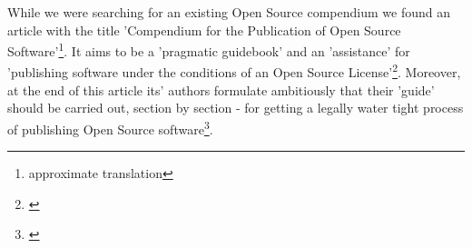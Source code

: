 %
%
%
%

%
While we were searching for an existing Open Source compendium we found an
article with the title 'Compendium for the Publication of Open Source
Software'\footnote{approximate translation}. It aims to be a 'pragmatic
guidebook' and an 'assistance' for 'publishing software under the conditions of
an Open Source License'\footnote{\cite[cf.][166f (originally: ein
\glqq{}pragmatischer Ratgeber\grqq{} zur \glqq{}Veröffentlichung einer Software
unter den Rahmenbedingungen einer Open-Source-Lizenz\grqq{}) ]{BreGlaGra2008a}}.
Moreover, at the end of this article its' authors formulate ambitiously that
their 'guide' should be carried out, section by section - for getting a legally
water tight process of publishing Open Source software\footnote{\cite[cf.][186
(originally: ein \glqq{}Ratgeber\grqq{}, der es erlaubt \glqq{} (\ldots) die zu
berücksichtigende Aspekte (strukturiert abzuarbeiten) (\ldots) \glqq{} und einen
\glqq{}rechtlich nicht angreifbaren Veröffentlichungsprozess\grqq{} zu
ermöglichen) ]{BreGlaGra2008a}}.

